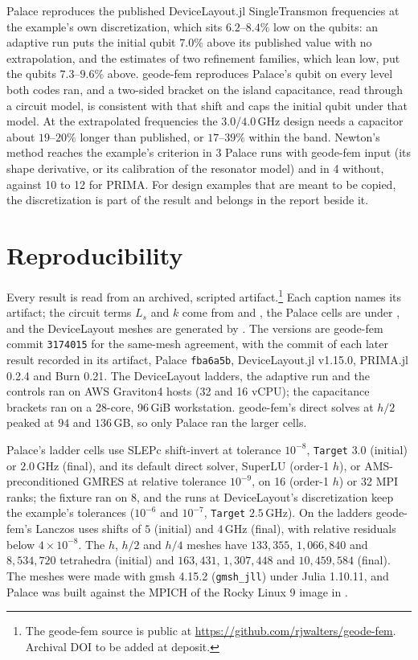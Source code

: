 \documentclass{anvil-paper}
\begin{document}
Palace reproduces the published DeviceLayout.jl SingleTransmon
frequencies at the example's own discretization, which sits $6.2$--$8.4\%$
low on the qubits: an adaptive run puts the initial qubit $7.0\%$ above its
published value with no extrapolation, and the estimates of two refinement
families, which lean low, put the qubits $7.3$--$9.6\%$ above. geode-fem
reproduces Palace's qubit on every level both codes ran, and a two-sided
bracket on the island capacitance, read through a circuit model, is
consistent with that shift and caps the initial qubit under that model. At
the extrapolated frequencies the $3.0$/$4.0$\,GHz design needs a capacitor
about $19$--$20\%$ longer than published, or $17$--$39\%$ within the band.
Newton's method reaches the
example's criterion in 3 Palace runs with geode-fem input (its shape
derivative, or its calibration of the resonator model) and in 4 without,
against 10 to 12 for PRIMA. For design examples that are meant to be
copied, the discretization is part of the result and belongs in the report
beside it.

\section{Reproducibility}
\label{sec:repro}

Every result is read from an archived, scripted artifact.\footnote{The geode-fem source is public at
\url{https://github.com/rjwalters/geode-fem}. Archival DOI to be added at
deposit.}
Each caption names its artifact; the circuit terms $L_s$
and $k$ come from  and
, the Palace cells are under
, and the DeviceLayout meshes are
generated by . The versions are geode-fem commit
\texttt{3174015} for the same-mesh agreement, with the commit of each later
result recorded in its artifact, Palace \texttt{fba6a5b}, DeviceLayout.jl
v1.15.0, PRIMA.jl 0.2.4 and Burn 0.21. The DeviceLayout ladders, the
adaptive run and the controls ran on AWS Graviton4 hosts (32 and 16
vCPU); the capacitance brackets ran on a 28-core, 96\,GiB workstation. geode-fem's
direct solves at $h/2$ peaked at $94$ and $136$\,GB, so only Palace ran
the larger cells.

Palace's ladder cells use SLEPc shift-invert at tolerance $10^{-8}$,
\texttt{Target} $3.0$ (initial) or $2.0$\,GHz (final), and its default
direct solver, SuperLU (order-1 $h$), or AMS-preconditioned GMRES at relative
tolerance $10^{-9}$, on 16 (order-1 $h$) or 32 MPI ranks; the fixture ran
on 8, and the runs at DeviceLayout's discretization keep the example's
tolerances ($10^{-6}$ and $10^{-7}$, \texttt{Target} $2.5$\,GHz). On the ladders geode-fem's
Lanczos uses shifts of $5$ (initial) and $4$\,GHz (final), with relative
residuals below $4\times10^{-8}$.
The $h$, $h/2$ and $h/4$ meshes have $133{,}355$, $1{,}066{,}840$ and
$8{,}534{,}720$ tetrahedra (initial) and $163{,}431$, $1{,}307{,}448$ and
$10{,}459{,}584$ (final). The meshes were made
with gmsh 4.15.2 (\texttt{gmsh\_jll}) under Julia 1.10.11, and Palace was
built against the MPICH of the Rocky Linux 9 image in
.
\end{document}
